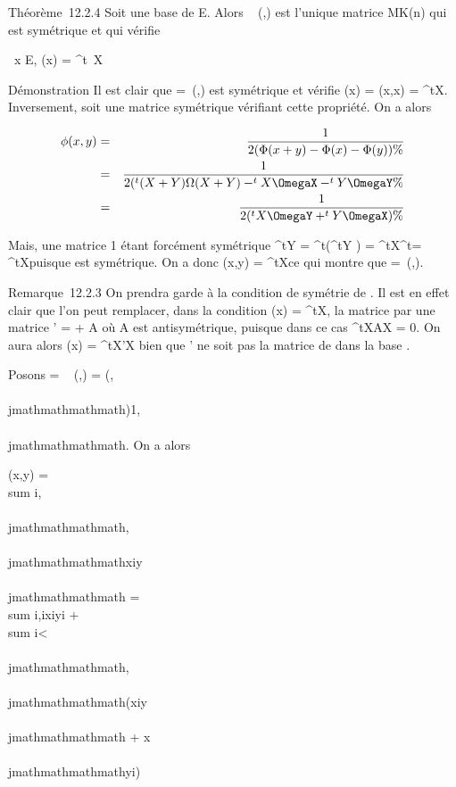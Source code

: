 Théorème~12.2.4 Soit  une base de E. Alors
\mathrmMat~ (\phi,) est
l'unique matrice \Omega \in MK(n) qui est symétrique et qui vérifie

\forall~x \in E, \Phi(x) = ^t~X\OmegaX

Démonstration Il est clair que \Omega =\
\mathrmMat (\Phi,) est symétrique et vérifie \Phi(x) =
\phi(x,x) = ^tX\OmegaX. Inversement, soit \Omega une matrice symétrique
vérifiant cette propriété. On a alors

\begin{align*} \phi(x,y)& =& 1 \over
2 (\Phi(x + y) - \Phi(x) - \Phi(y)) \%& \\ &
=& 1 \over 2 (^t(X + Y )\Omega(X + Y )
-^tX\OmegaX -^tY \OmegaY \%&
\\ & =& 1 \over 2
(^tX\OmegaY + ^tY \OmegaX) \%&
\\ \end{align*}

Mais, une matrice 1  étant forcément symétrique ^tY \OmegaX =
^t(^tY \OmegaX) = ^tX^t\OmegaY =
^tX\OmegaY puisque \Omega est symétrique. On a donc \phi(x,y) =
^tX\OmegaY ce qui montre que \Omega =\
\mathrmMat (\phi,).

Remarque~12.2.3 On prendra garde à la condition de symétrie de \Omega. Il est
en effet clair que l'on peut remplacer, dans la condition \Phi(x) =
^tX\OmegaX, la matrice \Omega par une matrice \Omega' = \Omega + A où A est
antisymétrique, puisque dans ce cas ^tXAX = 0. On aura alors
\Phi(x) = ^tX\Omega'X bien que \Omega' ne soit pas la matrice de \Phi dans la
base \mathcal{E}.

Posons \Omega = \mathrmMat~ (\phi,)
= (\omegai,\\\\jmathmathmathmath)1\leqi,\\\\jmathmathmathmath\leqn. On a alors

\phi(x,y) = \\sum
i,\\\\jmathmathmathmath\omegai,\\\\jmathmathmathmathxiy\\\\jmathmathmathmath =
\\sum
i\omegai,ixiyi +
\\sum
i\textless{}\\\\jmathmathmathmath\omegai,\\\\jmathmathmathmath(xiy\\\\jmathmathmathmath +
x\\\\jmathmathmathmathyi)

